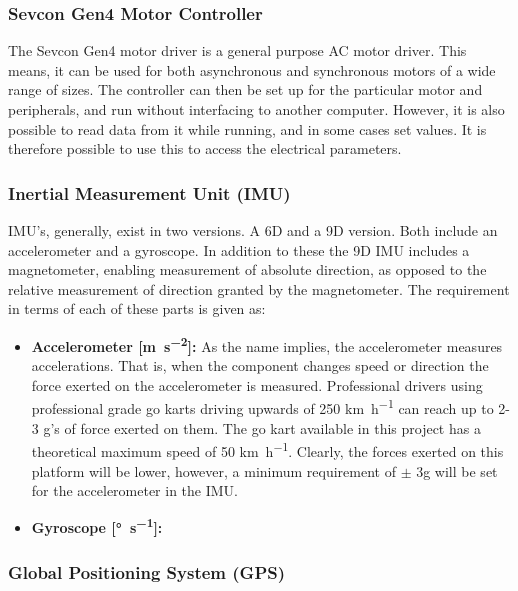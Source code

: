 \subsubsection*{Sevcon Gen4 Motor Controller}
\label{sec:interfacin_with_sevcon}

The Sevcon Gen4 motor driver is a general purpose AC motor driver. 
This means, it can be used for both asynchronous and synchronous motors of a wide range of sizes.
The controller can then be set up for the particular motor and peripherals, and run without interfacing to another computer.
However, it is also possible to read data from it while running, and in some cases set values.
It is therefore possible to use this to access the electrical parameters. \\


\subsubsection*{Inertial Measurement Unit (IMU)}
IMU's, generally, exist in two versions.
A 6D and a 9D version.
Both include an accelerometer and a gyroscope.
In addition to these the 9D IMU includes a magnetometer, enabling measurement of absolute direction, as opposed to the relative measurement of direction granted by the magnetometer.
The requirement in terms of each of these parts is given as:
\begin{itemize}
	\item \textbf{Accelerometer [\si{\metre\per\second^2}]:} As the name implies, the accelerometer measures accelerations.
	That is, when the component changes speed or direction the force exerted on the accelerometer is measured.
	Professional drivers using professional grade go karts driving upwards of 250 \si{\kilo\metre\per\hour} can reach up to 2-3 g's of force exerted on them.
	The go kart available in this project has a theoretical maximum speed of 50 \si{\kilo\metre\per\hour}.
	Clearly, the forces exerted on this platform will be lower, however, a minimum requirement of $\pm$ 3g will be set for the accelerometer in the IMU.
	\item \textbf{Gyroscope [\si{\degree\per\second}]:} 
\end{itemize}

\subsubsection*{Global Positioning System (GPS)}


